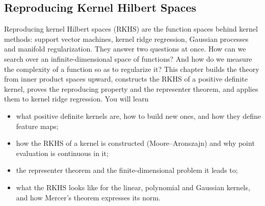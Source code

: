 \begin{notechapter}
\forgetcs\hilb{}
\forgetcs\hk{}
\forgetcs\X{}
\forgetcs\mat\newcommand{\mat}[1]{\mathbf{#1}}
\forgetcs\vect\newcommand{\vect}[1]{\boldsymbol{#1}}
\forgetcs\spn\newcommand{\spn}{\operatorname{span}}
\chapter{Reproducing Kernel Hilbert Spaces}\label{ch:rkhs}

\begin{chapterintro}
Reproducing kernel Hilbert spaces (RKHS) are the function spaces behind kernel methods: support vector machines, kernel ridge regression, Gaussian processes and manifold regularization. They answer two questions at once. How can we search over an infinite-dimensional space of functions? And how do we measure the complexity of a function so as to regularize it? This chapter builds the theory from inner product spaces upward, constructs the RKHS of a positive definite kernel, proves the reproducing property and the representer theorem, and applies them to kernel ridge regression. You will learn
\begin{itemize}[nosep]
  \item what positive definite kernels are, how to build new ones, and how they define feature maps;
  \item how the RKHS of a kernel is constructed (Moore--Aronszajn) and why point evaluation is continuous in it;
  \item the representer theorem and the finite-dimensional problem it leads to;
  \item what the RKHS looks like for the linear, polynomial and Gaussian kernels, and how Mercer's theorem expresses its norm.
\end{itemize}
\end{chapterintro}


\end{notechapter}
